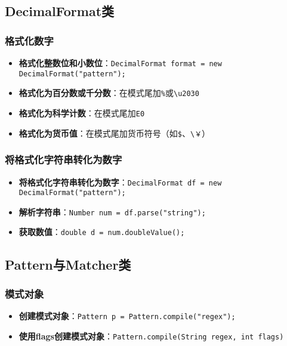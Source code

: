 \documentclass[a4paper, 10pt]{ctexart}
\begin{document}
\subsection{DecimalFormat类}
\subsubsection{格式化数字}
\begin{itemize}
  \item \textbf{格式化整数位和小数位}：\texttt{DecimalFormat format = new DecimalFormat("pattern");}
  \item \textbf{格式化为百分数或千分数}：在模式尾加\texttt{\%}或\texttt{\textbackslash u2030}
  \item \textbf{格式化为科学计数}：在模式尾加\texttt{E0}
  \item \textbf{格式化为货币值}：在模式尾加货币符号（如\texttt{\$}、\texttt{\textbackslash ￥}）
\end{itemize}

\subsubsection{将格式化字符串转化为数字}
\begin{itemize}
  \item \textbf{将格式化字符串转化为数字}：\texttt{DecimalFormat df = new DecimalFormat("pattern");}
  \item \textbf{解析字符串}：\texttt{Number num = df.parse("string");}
  \item \textbf{获取数值}：\texttt{double d = num.doubleValue();}
\end{itemize}

\subsection{Pattern与Matcher类}
\subsubsection{模式对象}
\begin{itemize}
  \item \textbf{创建模式对象}：\texttt{Pattern p = Pattern.compile("regex");}
  \item \textbf{使用flags创建模式对象}：\texttt{Pattern.compile(String regex, int flags)}
\end{itemize}
\end{document}
